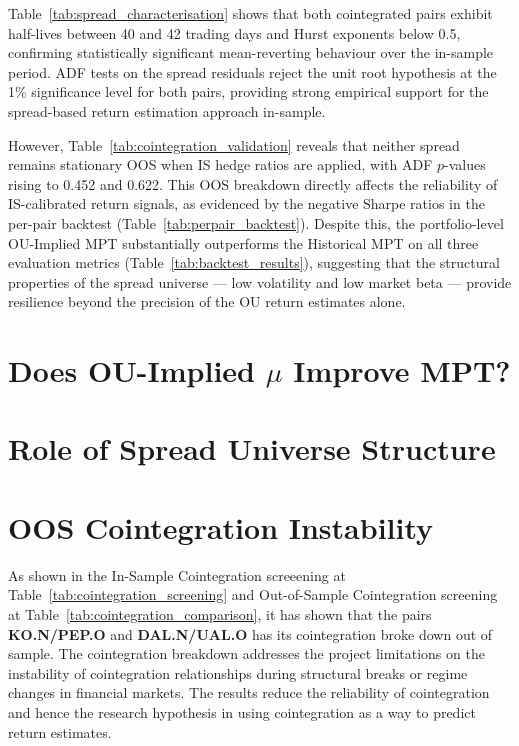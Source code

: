 \documentclass[a4paper]{report}
\begin{document}
Table~\ref{tab:spread_characterisation} shows that both cointegrated pairs exhibit
half-lives between 40 and 42 trading days and Hurst exponents below 0.5, confirming
statistically significant mean-reverting behaviour over the in-sample period. ADF tests
on the spread residuals reject the unit root hypothesis at the 1\% significance level
for both pairs, providing strong empirical support for the spread-based return
estimation approach in-sample.

However, Table~\ref{tab:cointegration_validation} reveals that neither spread
remains stationary OOS when IS hedge ratios are applied, with ADF $p$-values rising
to 0.452 and 0.622. This OOS breakdown directly affects the reliability of IS-calibrated
return signals, as evidenced by the negative Sharpe ratios in the per-pair backtest
(Table~\ref{tab:perpair_backtest}). Despite this, the portfolio-level OU-Implied MPT
substantially outperforms the Historical MPT on all three evaluation metrics
(Table~\ref{tab:backtest_results}), suggesting that the structural properties of
the spread universe — low volatility and low market beta — provide resilience
beyond the precision of the OU return estimates alone.

\section{Does OU-Implied $\mu$ Improve MPT?}


\section{Role of Spread Universe Structure}

\section{OOS Cointegration Instability}

As shown in the In-Sample Cointegration screeening at Table~\ref{tab:cointegration_screening} and Out-of-Sample Cointegration screening at Table~\ref{tab:cointegration_comparison}, it has shown that the pairs \textbf{KO.N/PEP.O} and \textbf{DAL.N/UAL.O} has its cointegration broke down out of sample. The cointegration breakdown addresses the project limitations on the instability of cointegration relationships during structural breaks or regime changes in financial markets. The results reduce the reliability of cointegration and hence the research hypothesis in using cointegration as a way to predict return estimates.
\end{document}
